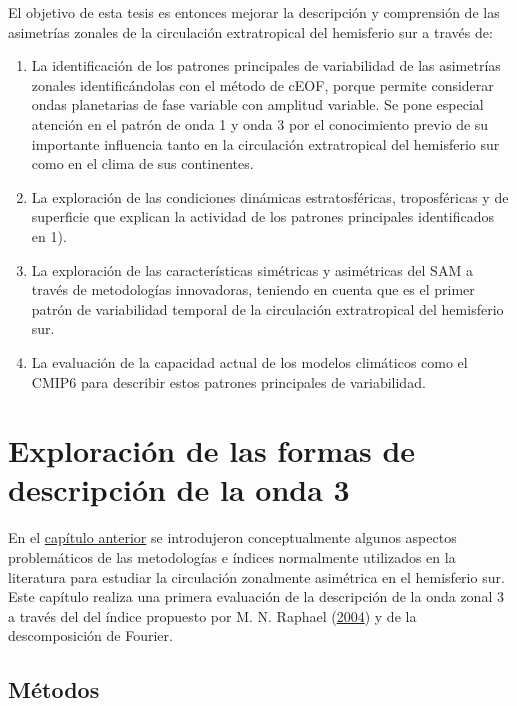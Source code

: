 \documentclass[12pt,oneside,a4paper]{reedthesis}
\begin{document}
El objetivo de esta tesis es entonces mejorar la descripción y comprensión de las asimetrías zonales de la circulación extratropical del hemisferio sur a través de:

\begin{enumerate}
\def\labelenumi{\arabic{enumi}.}
\item
  La identificación de los patrones principales de variabilidad de las asimetrías zonales identificándolas con el método de cEOF, porque permite considerar ondas planetarias de fase variable con amplitud variable.
  Se pone especial atención en el patrón de onda 1 y onda 3 por el conocimiento previo de su importante influencia tanto en la circulación extratropical del hemisferio sur como en el clima de sus continentes.
\item
  La exploración de las condiciones dinámicas estratosféricas, troposféricas y de superficie que explican la actividad de los patrones principales identificados en 1).
\item
  La exploración de las características simétricas y asimétricas del SAM a través de metodologías innovadoras, teniendo en cuenta que es el primer patrón de variabilidad temporal de la circulación extratropical del hemisferio sur.
\item
  La evaluación de la capacidad actual de los modelos climáticos como el CMIP6 para describir estos patrones principales de variabilidad.
\end{enumerate}

\hypertarget{onda3}{%
\chapter{Exploración de las formas de descripción de la onda 3}\label{onda3}}

En el \protect\hyperlink{intro}{capítulo anterior} se introdujeron conceptualmente algunos aspectos problemáticos de las metodologías e índices normalmente utilizados en la literatura para estudiar la circulación zonalmente asimétrica en el hemisferio sur.
Este capítulo realiza una primera evaluación de la descripción de la onda zonal 3 a través del del índice propuesto por M. N. Raphael (\protect\hyperlink{ref-raphael2004}{2004}) y de la descomposición de Fourier.

\hypertarget{muxe9todos}{%
\section{Métodos}\label{muxe9todos}}
\end{document}
